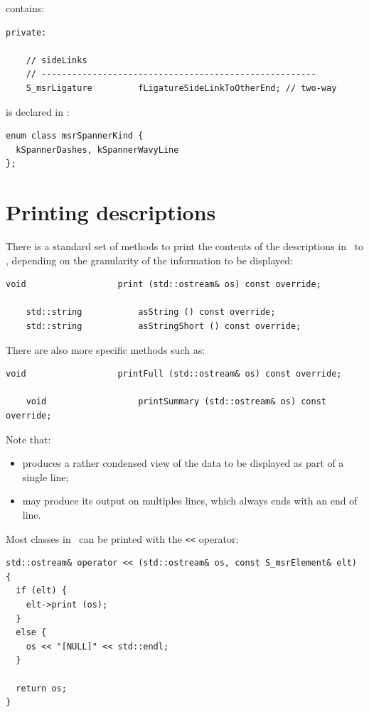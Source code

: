  contains:
\begin{lstlisting}[language=CPlusPlus]
  private:

    // sideLinks
    // ------------------------------------------------------
    S_msrLigature         fLigatureSideLinkToOtherEnd; // two-way
\end{lstlisting}

\EnumType{} is declared in :
\begin{lstlisting}[language=CPlusPlus]
enum class msrSpannerKind {
  kSpannerDashes, kSpannerWavyLine
};
\end{lstlisting}


\section{Printing descriptions}\label{Printing descriptions}

There is a standard set of methods to print the contents of the descriptions in \mf\ to \standardOutput, depending on the granularity of the information to be displayed:
\begin{lstlisting}[language=CPlusPlus]
    void                  print (std::ostream& os) const override;

    std::string           asString () const override;
    std::string           asStringShort () const override;
\end{lstlisting}

There are also more specific methods such as:
\begin{lstlisting}[language=CPlusPlus]
    void                  printFull (std::ostream& os) const override;

    void                  printSummary (std::ostream& os) const override;
\end{lstlisting}

Note that:
\begin{itemize}
\item {} produces a rather condensed view of the data to be displayed as part of a single line;
\item {} may produce its output on multiples lines, which always ends with an end of line.
\end{itemize}

Most classes in \mf\ can be printed with the {\tt <<} operator:
\begin{lstlisting}[language=CPlusPlus]
std::ostream& operator << (std::ostream& os, const S_msrElement& elt)
{
  if (elt) {
    elt->print (os);
  }
  else {
    os << "[NULL]" << std::endl;
  }

  return os;
}
\end{lstlisting}

